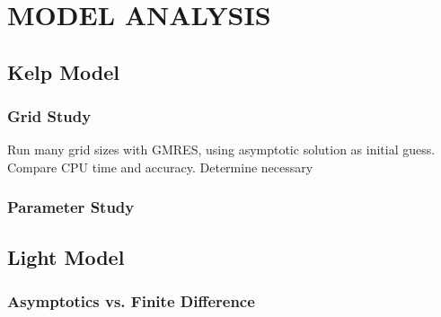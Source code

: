 \chapter{MODEL ANALYSIS} \label{ch:model_analysis}

\section{Kelp Model}
\subsection{Grid Study}
Run many grid sizes with GMRES, using asymptotic solution as initial guess.
Compare CPU time and accuracy. Determine necessary 

\subsection{Parameter Study}

\section{Light Model}

\subsection{Asymptotics vs. Finite Difference}